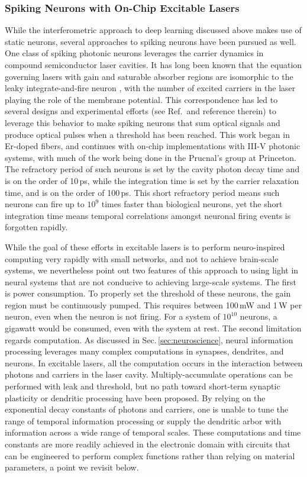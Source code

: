 \subsubsection{Spiking Neurons with On-Chip Excitable Lasers}
While the interferometric approach to deep learning discussed above makes use of static neurons, several approaches to spiking neurons have been pursued as well. One class of spiking photonic neurons leverages the carrier dynamics in compound semiconductor laser cavities. It has long been known that the equation governing lasers with gain and saturable absorber regions are isomorphic to the leaky integrate-and-fire neuron \cite{dukr1999}, with the number of excited carriers in the laser playing the role of the membrane potential. This correspondence has led to several designs \cite{nata2013} and experimental efforts (see Ref.\,\cite{prsh2017} and reference therein) to leverage this behavior to make spiking neurons that sum optical signals and produce optical pulses when a threshold has been reached. This work began in Er-doped fibers, and continues with on-chip implementations with III-V photonic systems, with much of the work being done in the Prucnal's group at Princeton. The refractory period of such neurons is set by the cavity photon decay time and is on the order of 10\,ps, while the integration time is set by the carrier relaxation time, and is on the order of 100\,ps. This short refractory period means such neurons can fire up to $10^9$ times faster than biological neurons, yet the short integration time means temporal correlations amongst neuronal firing events is forgotten rapidly. 

While the goal of these efforts in excitable lasers is to perform neuro-inspired computing very rapidly with small networks, and not to achieve brain-scale systems, we nevertheless point out two features of this approach to using light in neural systems that are not conducive to achieving large-scale systems. The first is power consumption. To properly set the threshold of these neurons, the gain region must be continuously pumped. This requires between 100\,mW and 1\,W per neuron, even when the neuron is not firing. For a system of $10^{10}$ neurons, a gigawatt would be consumed, even with the system at rest. The second limitation regards computation. As discussed in Sec.\,\ref{sec:neuroscience}, neural information processing leverages many complex computations in synapses, dendrites, and neurons. In excitable lasers, all the computation occurs in the interaction between photons and carriers in the laser cavity. Multiply-accumulate operations can be performed with leak and threshold, but no path toward short-term synaptic plasticity or dendritic processing have been proposed. By relying on the exponential decay constants of photons and carriers, one is unable to tune the range of temporal information processing or supply the dendritic arbor with information across a wide range of temporal scales. These computations and time constants are more readily achieved in the electronic domain with circuits that can be engineered to perform complex functions rather than relying on material parameters, a point we revisit below.

